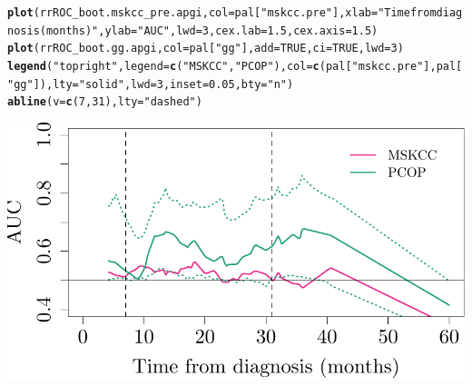 \documentclass{article}\usepackage[]{graphicx}\usepackage[]{color}
\makeatletter
\def\maxwidth{ %
  \ifdim\Gin@nat@width>\linewidth
    \linewidth
  \else
    \Gin@nat@width
  \fi
}
\newcommand{\hlnum}[1]{\textcolor[rgb]{0.686,0.059,0.569}{#1}}%
\newcommand{\hlstr}[1]{\textcolor[rgb]{0.192,0.494,0.8}{#1}}%
\newcommand{\hlstd}[1]{\textcolor[rgb]{0.345,0.345,0.345}{#1}}%
\newcommand{\hlkwc}[1]{\textcolor[rgb]{0.333,0.667,0.333}{#1}}%
\newcommand{\hlkwd}[1]{\textcolor[rgb]{0.737,0.353,0.396}{\textbf{#1}}}%
\newenvironment{kframe}{%
 \def\at@end@of@kframe{}%
 \ifinner\ifhmode%
  \def\at@end@of@kframe{\end{minipage}}%
  \begin{minipage}{\columnwidth}%
 \fi\fi%
 \def\FrameCommand##1{\hskip\@totalleftmargin \hskip-\fboxsep
 \colorbox{shadecolor}{##1}\hskip-\fboxsep
     \hskip-\linewidth \hskip-\@totalleftmargin \hskip\columnwidth}%
 \MakeFramed {\advance\hsize-\width
   \@totalleftmargin\z@ \linewidth\hsize
   \@setminipage}}%
 {\par\unskip\endMakeFramed%
 \at@end@of@kframe}
\newenvironment{knitrout}{}{} %
\makeatother
\begin{document}
\begin{knitrout}
\color{fgcolor}\begin{kframe}
\begin{alltt}
\hlkwd{plot}\hlstd{(rrROC_boot.mskcc_pre.apgi,} \hlkwc{col} \hlstd{= pal[}\hlstr{"mskcc.pre"}\hlstd{],} \hlkwc{xlab} \hlstd{=} \hlstr{"Time from diagnosis (months)"}\hlstd{,} \hlkwc{ylab} \hlstd{=} \hlstr{"AUC"}\hlstd{,} \hlkwc{lwd} \hlstd{=} \hlnum{3}\hlstd{,} \hlkwc{cex.lab} \hlstd{=} \hlnum{1.5}\hlstd{,} \hlkwc{cex.axis} \hlstd{=} \hlnum{1.5}\hlstd{)}
\hlkwd{plot}\hlstd{(rrROC_boot.gg.apgi,} \hlkwc{col} \hlstd{= pal[}\hlstr{"gg"}\hlstd{],} \hlkwc{add} \hlstd{=} \hlnum{TRUE}\hlstd{,} \hlkwc{ci} \hlstd{=} \hlnum{TRUE}\hlstd{,} \hlkwc{lwd} \hlstd{=} \hlnum{3}\hlstd{)}
\hlkwd{legend}\hlstd{(}\hlstr{"topright"}\hlstd{,} \hlkwc{legend} \hlstd{=} \hlkwd{c}\hlstd{(}\hlstr{"MSKCC"}\hlstd{,} \hlstr{"PCOP"}\hlstd{),} \hlkwc{col} \hlstd{=} \hlkwd{c}\hlstd{(pal[}\hlstr{"mskcc.pre"}\hlstd{], pal[}\hlstr{"gg"}\hlstd{]),} \hlkwc{lty} \hlstd{=} \hlstr{"solid"}\hlstd{,} \hlkwc{lwd} \hlstd{=} \hlnum{3}\hlstd{,} \hlkwc{inset} \hlstd{=} \hlnum{0.05}\hlstd{,} \hlkwc{bty} \hlstd{=} \hlstr{"n"}\hlstd{)}
\hlkwd{abline}\hlstd{(}\hlkwc{v} \hlstd{=} \hlkwd{c}\hlstd{(}\hlnum{7}\hlstd{,} \hlnum{31}\hlstd{),} \hlkwc{lty} \hlstd{=} \hlstr{"dashed"}\hlstd{)}
\end{alltt}
\end{kframe}

{\centering \includegraphics[width=\maxwidth]{figure/07-risksetROC-plot-apgi-1} 

}



\end{knitrout}
\end{document}
